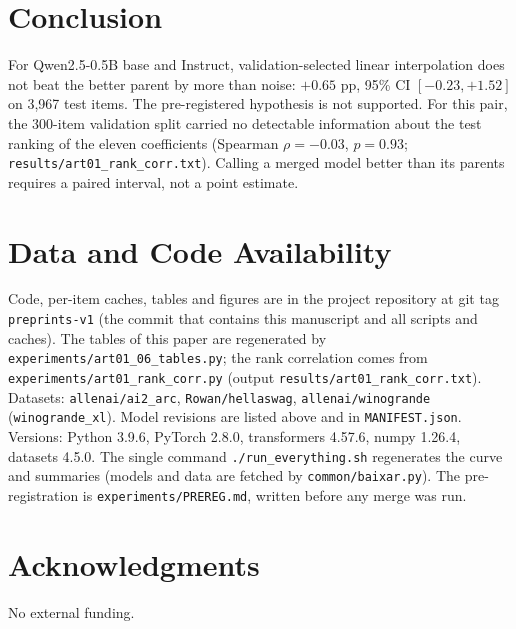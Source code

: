 \documentclass[conference]{IEEEtran}
\begin{document}
\section{Conclusion}
For Qwen2.5-0.5B base and Instruct, validation-selected linear interpolation does not beat the better parent by more than noise: $+0.65$ pp, 95\% CI $[-0.23,+1.52]$ on 3{,}967 test items. The pre-registered hypothesis is not supported. For this pair, the 300-item validation split carried no detectable information about the test ranking of the eleven coefficients (Spearman $\rho=-0.03$, $p=0.93$; \texttt{results/art01\_rank\_corr.txt}). Calling a merged model better than its parents requires a paired interval, not a point estimate.

\section*{Data and Code Availability}
Code, per-item caches, tables and figures are in the project repository at git tag \texttt{preprints-v1} (the commit that contains this manuscript and all scripts and caches). The tables of this paper are regenerated by \texttt{experiments/art01\_06\_tables.py}; the rank correlation comes from \texttt{experiments/art01\_rank\_corr.py} (output \texttt{results/art01\_rank\_corr.txt}). Datasets: \texttt{allenai/ai2\_arc}, \texttt{Rowan/hellaswag}, \texttt{allenai/winogrande} (\texttt{winogrande\_xl}). Model revisions are listed above and in \texttt{MANIFEST.json}. Versions: Python 3.9.6, PyTorch 2.8.0, transformers 4.57.6, numpy 1.26.4, datasets 4.5.0. The single command \texttt{./run\_everything.sh} regenerates the curve and summaries (models and data are fetched by \texttt{common/baixar.py}). The pre-registration is \texttt{experiments/PREREG.md}, written before any merge was run.

\section*{Acknowledgments}
No external funding.
\end{document}
